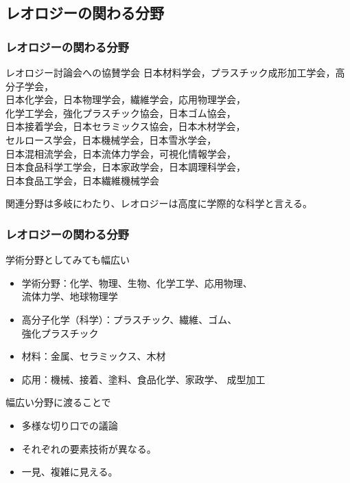 \documentclass[12pt, dvipdfmx]{beamer}
\begin{document}
\subsection{レオロジーの関わる分野}
\begin{frame}
	\frametitle{レオロジーの関わる分野}
	\begin{block}{レオロジー討論会への協賛学会}
		日本材料学会，プラスチック成形加工学会，高分子学会，\\
		日本化学会，日本物理学会，繊維学会，応用物理学会，\\
		化学工学会，強化プラスチック協会，日本ゴム協会，\\
		日本接着学会，日本セラミックス協会，日本木材学会，\\
		セルロース学会，日本機械学会，日本雪氷学会，\\
		日本混相流学会，日本流体力学会，可視化情報学会，\\
		日本食品科学工学会，日本家政学会，日本調理科学会，\\
		日本食品工学会，日本繊維機械学会
	\end{block}
	関連分野は多岐にわたり、レオロジーは⾼度に学際的な科学と言える。
\end{frame}

\begin{frame}
	\frametitle{レオロジーの関わる分野}
	\begin{block}{学術分野としてみても幅広い}
		\begin{itemize}
			\item
			  学術分野：化学、物理、生物、化学工学、応用物理、\\
			  流体力学、地球物理学
			\item
			  高分子化学（科学）：プラスチック、繊維、ゴム、\\
			  強化プラスチック
			\item
			  材料：金属、セラミックス、木材
			\item
			  応用：機械、接着、塗料、食品化学、家政学、
			  成型加工
		\end{itemize}
	\end{block}
	\begin{alertblock}{幅広い分野に渡ることで}
		\begin{itemize}
			\item 多様な切り口での議論
			\item それぞれの要素技術が異なる。
			\item 一見、複雑に見える。
		\end{itemize}
	\end{alertblock}
\end{frame}
\end{document}
